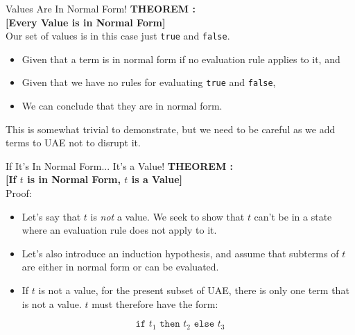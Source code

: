\documentclass[11pt]{beamer}
\begin{document}
\begin{frame}[fragile=singleslide]{Values Are In Normal Form!}
\textbf{THEOREM :} \\
\textbf{[Every Value is in Normal Form]}  \\
Our set of values is in this case just \texttt{true} and \texttt{false}.
\begin{itemize}
\item Given that a term is in normal form if no evaluation rule applies to it, and 
\item Given that we have no rules for evaluating \texttt{true} and \texttt{false}, 
\item We can conclude that they are in normal form.
\end{itemize}
This is somewhat trivial to demonstrate, but we need to be careful as we add terms to UAE not to disrupt it.
\end{frame}

\begin{frame}[fragile=singleslide]{If It's In Normal Form... It's a Value!}
\textbf{THEOREM :} \\
\textbf{[If $t$ is in Normal Form, $t$ is a Value]}  \\
Proof:
\begin{itemize}
\item Let's say that $t$ is \emph{not} a value.  We seek to show that $t$ can't be in a state where an evaluation rule does not apply to it.
\item Let's also introduce an induction hypothesis, and assume that subterms of $t$ are either in normal form or can be evaluated.  
\item If $t$ is not a value, for the present subset of UAE, there is only one term that is not a value. $t$ must therefore have the form:
\end{itemize}
\begin{equation}
\texttt{if } t_1 \texttt{ then } t_2 \texttt{ else } t_3
\end{equation}
\end{frame}
\end{document}
